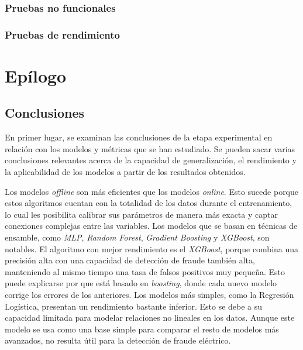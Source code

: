 \documentclass[12pt,a4paper]{report}
\begin{document}
\section{Pruebas no funcionales}


\section{Pruebas de rendimiento}



\part{Epílogo}


\chapter{Conclusiones}

En primer lugar, se examinan las conclusiones de la etapa experimental en relación con los modelos y métricas que se han estudiado. Se pueden sacar varias conclusiones relevantes acerca de la capacidad de generalización, el rendimiento y la aplicabilidad de los modelos a partir de los resultados obtenidos.

Los modelos \emph{offline} son más eficientes que los modelos \emph{online}. Esto sucede porque estos algoritmos cuentan con la totalidad de los datos durante el entrenamiento, lo cual les posibilita calibrar sus parámetros de manera más exacta y captar conexiones complejas entre las variables. Los modelos que se basan en técnicas de ensamble, como \emph{MLP}, \emph{Random Forest}, \emph{Gradient Boosting} y \emph{XGBoost}, son notables. El algoritmo con mejor rendimiento es el \emph{XGBoost}, porque combina una precisión alta con una capacidad de detección de fraude también alta, manteniendo al mismo tiempo una tasa de falsos positivos muy pequeña. Esto puede explicarse por que está basado en \emph{boosting}, donde cada nuevo modelo corrige los errores de los anteriores. Los modelos más simples, como la Regresión Logística, presentan un rendimiento bastante inferior. Esto se debe a su capacidad limitada para modelar relaciones no lineales en los datos. Aunque este modelo se usa como una base simple para comparar el resto de modelos más avanzados, no resulta útil para la detección de fraude eléctrico.
\end{document}
